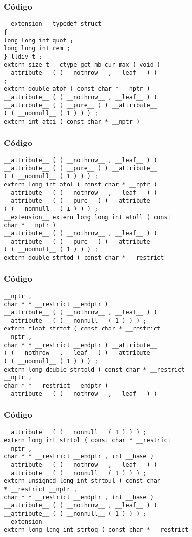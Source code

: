 \documentclass{beamer}
\begin{document}
\begin{frame}[fragile]
\frametitle{C\'odigo}
\begin{verbatim}
__extension__ typedef struct 
{ 
long long int quot ; 
long long int rem ; 
} lldiv_t ; 
extern size_t __ctype_get_mb_cur_max ( void ) 
__attribute__ ( ( __nothrow__ , __leaf__ ) ) 
; 
extern double atof ( const char * __nptr ) 
__attribute__ ( ( __nothrow__ , __leaf__ ) ) 
__attribute__ ( ( __pure__ ) ) __attribute__ 
( ( __nonnull__ ( 1 ) ) ) ; 
extern int atoi ( const char * __nptr ) 
\end{verbatim}
\end{frame}
\begin{frame}[fragile]
\frametitle{C\'odigo}
\begin{verbatim}
__attribute__ ( ( __nothrow__ , __leaf__ ) ) 
__attribute__ ( ( __pure__ ) ) __attribute__ 
( ( __nonnull__ ( 1 ) ) ) ; 
extern long int atol ( const char * __nptr ) 
__attribute__ ( ( __nothrow__ , __leaf__ ) ) 
__attribute__ ( ( __pure__ ) ) __attribute__ 
( ( __nonnull__ ( 1 ) ) ) ; 
__extension__ extern long long int atoll ( const 
char * __nptr ) 
__attribute__ ( ( __nothrow__ , __leaf__ ) ) 
__attribute__ ( ( __pure__ ) ) __attribute__ 
( ( __nonnull__ ( 1 ) ) ) ; 
extern double strtod ( const char * __restrict 
\end{verbatim}
\end{frame}
\begin{frame}[fragile]
\frametitle{C\'odigo}
\begin{verbatim}
__nptr , 
char * * __restrict __endptr ) 
__attribute__ ( ( __nothrow__ , __leaf__ ) ) 
__attribute__ ( ( __nonnull__ ( 1 ) ) ) ; 
extern float strtof ( const char * __restrict 
__nptr , 
char * * __restrict __endptr ) __attribute__ 
( ( __nothrow__ , __leaf__ ) ) __attribute__ 
( ( __nonnull__ ( 1 ) ) ) ; 
extern long double strtold ( const char * __restrict 
__nptr , 
char * * __restrict __endptr ) 
__attribute__ ( ( __nothrow__ , __leaf__ ) ) 
\end{verbatim}
\end{frame}
\begin{frame}[fragile]
\frametitle{C\'odigo}
\begin{verbatim}
__attribute__ ( ( __nonnull__ ( 1 ) ) ) ; 
extern long int strtol ( const char * __restrict 
__nptr , 
char * * __restrict __endptr , int __base ) 
__attribute__ ( ( __nothrow__ , __leaf__ ) ) 
__attribute__ ( ( __nonnull__ ( 1 ) ) ) ; 
extern unsigned long int strtoul ( const char 
* __restrict __nptr , 
char * * __restrict __endptr , int __base ) 
__attribute__ ( ( __nothrow__ , __leaf__ ) ) 
__attribute__ ( ( __nonnull__ ( 1 ) ) ) ; 
__extension__ 
extern long long int strtoq ( const char * __restrict 
\end{verbatim}
\end{frame}
\end{document}

